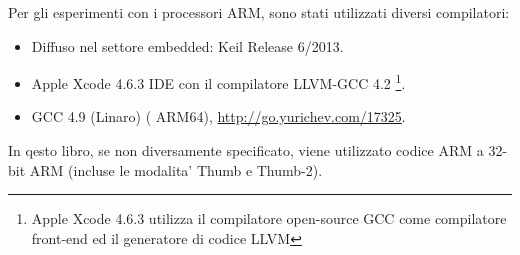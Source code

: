 \label{sec:hw_ARM}

\myindex{\idevices}
Per gli esperimenti con i processori ARM, sono stati utilizzati diversi compilatori:

\begin{itemize}
\item Diffuso nel settore embedded: Keil Release 6/2013.

\item Apple Xcode 4.6.3 IDE con il compilatore LLVM-GCC 4.2
\footnote{Apple Xcode 4.6.3 utilizza il compilatore open-source GCC come compilatore front-end ed il generatore di codice LLVM}.

\item GCC 4.9 (Linaro) (\ITAph{} ARM64), \ITAph{} \url{http://go.yurichev.com/17325}.

\end{itemize}

In qesto libro, se non diversamente specificato, viene utilizzato codice ARM a 32-bit ARM (incluse le modalita' Thumb e Thumb-2).
\ITAph{}



